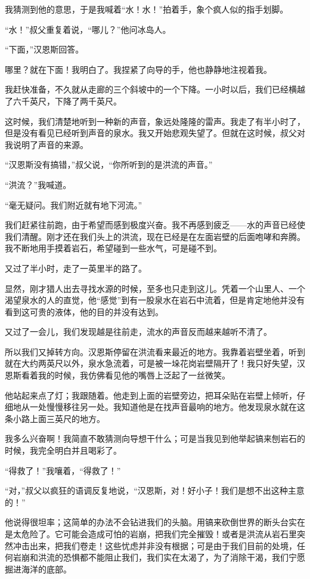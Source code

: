 \documentclass[10pt]{book}
\begin{document}
我猜测到他的意思，于是我喊着“水！水！”拍着手，象个疯人似的指手划脚。

“水！”叔父重复着说，“哪儿？”他问冰岛人。

“下面，”汉恩斯回答。

哪里？就在下面！我明白了。我捏紧了向导的手，他也静静地注视着我。

我赶快准备，不久就从走廊的三个斜坡中的一个下降。一小时以后，我们已经横越了六千英尺，下降了两千英尺。

这时候，我们清楚地听到一种新的声音，象远处隆隆的雷声。我走了有半小时了，但是没有看见已经听到声音的泉水。我又开始悲观失望了。但就在这时候，叔父对我说明了声音的来源。

“汉恩斯没有搞错，”叔父说，“你所听到的是洪流的声音。”

“洪流？”我喊道。

“毫无疑问。我们附近就有地下河流。”

我们赶紧往前跑，由于希望而感到极度兴奋。我不再感到疲乏——水的声音已经使我们清醒。刚才还在我们头上的洪流，现在已经是在左面岩壁的后面咆哮和奔腾。我不断地用手摸着岩石，希望碰到一些水气，可是碰不到。

又过了半小时，走了一英里半的路了。

显然，刚才猎人出去寻找水源的时候，至多也只走到这儿。凭着一个山里人、一个渴望泉水的人的直觉，他“感觉”到有一股泉水在岩石中流着，但是肯定地他并没有看到这可贵的液体，他的目的并没有达到。

又过了一会儿，我们发现越是往前走，流水的声音反而越来越听不清了。

所以我们又掉转方向。汉恩斯停留在洪流看来最近的地方。我靠着岩壁坐着，听到就在大约两英尺以外，泉水急流着，可是被一垛花岗岩壁隔开了！我只好失望，汉恩斯看着我的时候，我仿佛看见他的嘴唇上泛起了一丝微笑。

他站起来点了灯；我跟随着。他走到上面的岩壁旁边，把耳朵贴在岩壁上倾听，仔细地从一处慢慢移往另一处。我知道他是在找声音最响的地方。他发现泉水就在这条小路上面三英尺的地方。

我多么兴奋啊！我简直不敢猜测向导想干什么；可是当我见到他举起镐来刨岩石的时候，我完全明白并且喝彩了。

“得救了！”我嚷着，“得救了！”

“对，”叔父以疯狂的语调反复地说，“汉恩斯，对！好小子！我们是想不出这种主意的！”

他说得很坦率；这简单的办法不会钻进我们的头脑。用镐来砍倒世界的断头台实在是太危险了。它可能会造成可怕的岩崩，把我们完全摧毁！或者是洪流从岩石里突然冲击出来，把我们卷走！这些忧虑并非没有根据；可是由于我们目前的处境，任何岩崩和洪流的恐惧都不能阻止我们，我们实在太渴了，为了消除干渴，我们宁愿掘进海洋的底部。
\end{document}
